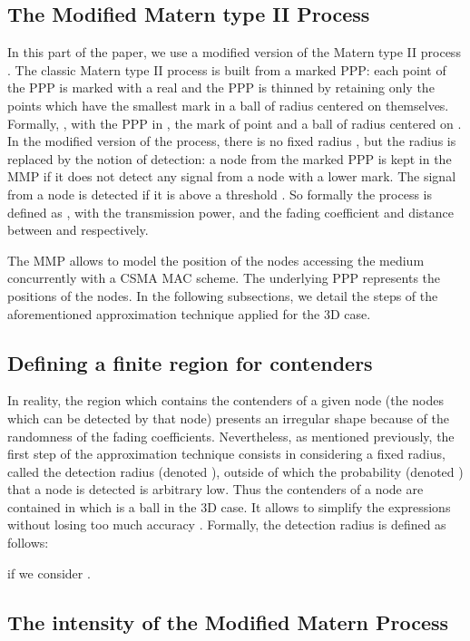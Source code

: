 \documentclass{sig-alternate-05-2015}
\begin{document}
\subsection{The Modified Matern type II Process}
\label{MMPmodelsec}

In this part of the paper, we use a modified version of the Matern type II process \cite{nguyen07}. The classic Matern type II process is built from a marked PPP: each point of the PPP is marked with a real  and the PPP is thinned by retaining only the points which have the smallest mark in a ball of radius  centered on themselves. Formally, , with  the PPP in ,  the mark of point  and  a ball of radius  centered on . In the modified version of the process, there is no fixed radius , but the radius is replaced by the notion of detection: a node from the marked PPP is kept in the MMP if it does not detect any signal from a node with a lower mark. The signal from a node is detected if it is above a threshold . So formally the process is defined as , with  the transmission power,  and  the fading coefficient and distance between  and  respectively.

The MMP allows to model the position of the nodes accessing the medium concurrently with a CSMA MAC scheme. The underlying PPP represents the positions of the nodes. In the following subsections, we detail the steps of the aforementioned approximation technique applied for the 3D case.

\subsection{Defining a finite region for contenders}

In reality, the region which contains the contenders of a given node (the nodes which can be detected by that node) presents an irregular shape because of the randomness of the fading coefficients. Nevertheless, as mentioned previously, the first step of the approximation technique consists in considering a fixed radius, called the detection radius (denoted ), outside of which the probability (denoted ) that a node is detected is arbitrary low. Thus the contenders of a node  are contained in  which is a ball in the 3D case. It allows to simplify the expressions without losing too much accuracy \cite{elsawy13}. Formally, the detection radius is defined as follows:


if we consider .

\subsection{The intensity of the Modified Matern Process}
\label{intensitysec}
\end{document}
